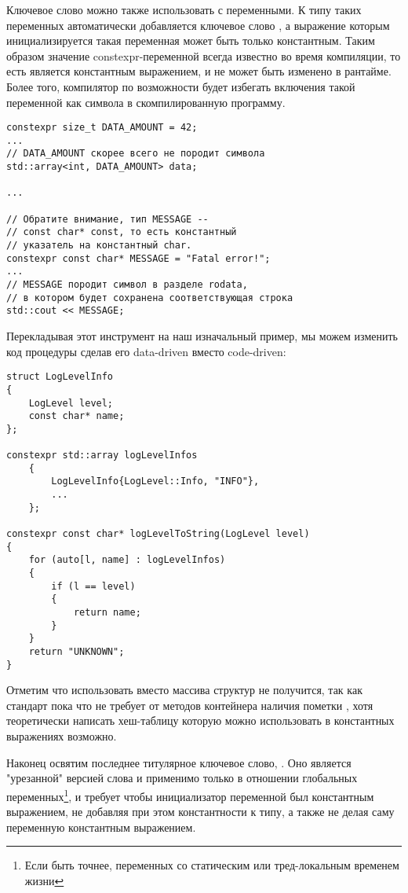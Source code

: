 Ключевое слово  можно также использовать с переменными. К типу таких переменных автоматически добавляется ключевое слово , а выражение которым инициализируется такая переменная может быть только константным. Таким образом значение constexpr-переменной всегда известно во время компиляции, то есть является константным выражением, и не может быть изменено в рантайме. Более того, компилятор по возможности будет избегать включения такой переменной как символа в скомпилированную программу.
\begin{verbatim}
constexpr size_t DATA_AMOUNT = 42;
...
// DATA_AMOUNT скорее всего не породит символа
std::array<int, DATA_AMOUNT> data;

...

// Обратите внимание, тип MESSAGE --
// const char* const, то есть константный
// указатель на константный char.
constexpr const char* MESSAGE = "Fatal error!";
...
// MESSAGE породит символ в разделе rodata,
// в котором будет сохранена соответствующая строка
std::cout << MESSAGE;
\end{verbatim}
Перекладывая этот инструмент на наш изначальный пример, мы можем изменить код процедуры  сделав его data-driven вместо code-driven:
\begin{verbatim}
struct LogLevelInfo
{
    LogLevel level;
    const char* name;
};

constexpr std::array logLevelInfos
    {
        LogLevelInfo{LogLevel::Info, "INFO"},
        ...
    };

constexpr const char* logLevelToString(LogLevel level)
{
    for (auto[l, name] : logLevelInfos)
    {
        if (l == level)
        {
            return name;
        }
    }
    return "UNKNOWN";
}
\end{verbatim}
Отметим что использовать  вместо массива структур не получится, так как стандарт пока что не требует от методов контейнера  наличия пометки , хотя теоретически написать хеш-таблицу которую можно использовать в константных выражениях возможно.

Наконец освятим последнее титулярное ключевое слово, . Оно является "урезанной" версией слова  и применимо только в отношении глобальных переменных\footnote{Если быть точнее, переменных со статическим или тред-локальным временем жизни}, и требует чтобы инициализатор переменной был константным выражением, не добавляя при этом константности к типу, а также не делая саму переменную константным выражением.

